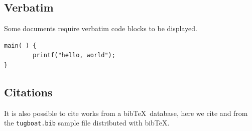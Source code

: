 \documentclass[a4paper,twocolumn]{article}
\begin{document}
\subsection{Verbatim}
Some documents require verbatim code blocks to be displayed.
\begin{verbatim}
main( ) {
        printf("hello, world");
}
\end{verbatim}

\subsection{Citations}
It is also possible to cite works from a bib\TeX\ database, here we
cite \cite{Knuth:TB5-1-67} and \cite{Hoekwater:TB28-3-312} from the
\texttt{tugboat.bib} sample file distributed with bib\TeX.


\raggedright

\end{document}

